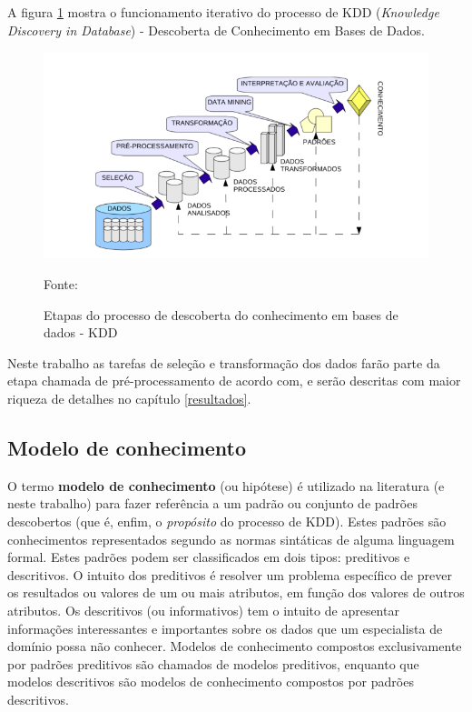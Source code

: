 A figura \ref{fig:processo-KDD} mostra o funcionamento iterativo do processo de KDD (\textit{Knowledge Discovery in Database}) -  Descoberta de Conhecimento em Bases de Dados.

\begin{figure}[h!]
	\centering
	\includegraphics[width=.6\textwidth]{imagens/processo-KDD.png}
	\caption{Etapas do processo de descoberta do conhecimento em bases de dados - KDD}
	{\scriptsize Fonte: \cite[p. 7]{vasconcelos_aplicacao_2018}}
	\label{fig:processo-KDD}
\end{figure}


Neste trabalho as tarefas de seleção e transformação dos dados farão parte da etapa chamada de pré-processamento de acordo com, \cite{Boscarioli2017} e serão descritas com maior riqueza de detalhes no capítulo \ref{resultados}.

\subsection{Modelo de conhecimento}\label{modelo_conhecimento}
O termo \textbf{modelo de conhecimento} (ou hipótese) é utilizado na literatura (e neste trabalho) para fazer referência a um padrão ou conjunto de padrões descobertos (que é, enfim, o \textit{propósito} do processo de KDD). Estes padrões são conhecimentos representados segundo as normas sintáticas de alguma linguagem formal. Estes padrões podem ser classificados em dois tipos: preditivos e descritivos. O intuito dos preditivos é resolver um problema específico de prever os resultados ou valores de um ou mais atributos, em função dos valores de outros atributos. Os descritivos (ou informativos) tem o intuito de apresentar informações interessantes e importantes sobre os dados que um especialista de domínio possa não conhecer. Modelos de conhecimento compostos exclusivamente por padrões preditivos são chamados de modelos preditivos, enquanto que modelos descritivos são modelos de conhecimento compostos por padrões descritivos. \cite{goldschmidt2005}\cite{ferrari2017}\cite{Boscarioli2017}

